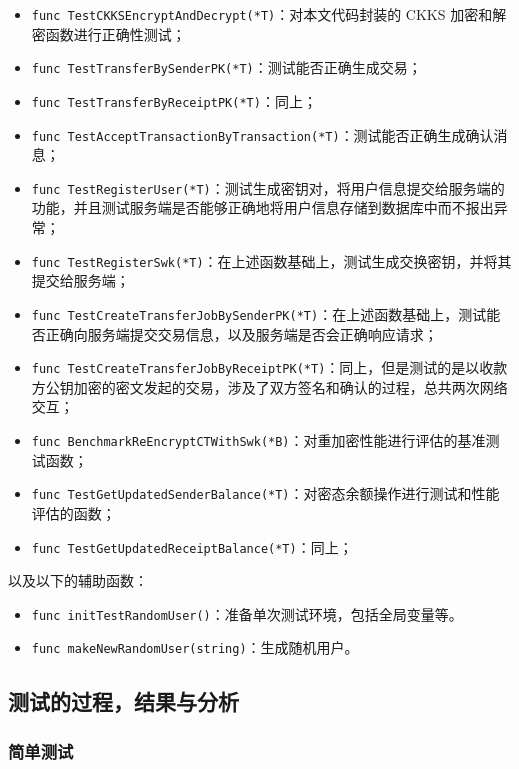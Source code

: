 \begin{itemize}
    \item \verb|func TestCKKSEncryptAndDecrypt(*T)|：对本文代码封装的 CKKS 加密和解密函数进行正确性测试；
    \item \verb|func TestTransferBySenderPK(*T)|：测试能否正确生成交易；
    \item \verb|func TestTransferByReceiptPK(*T)|：同上；
    \item \verb|func TestAcceptTransactionByTransaction(*T)|：测试能否正确生成确认消息；
    \item \verb|func TestRegisterUser(*T)|：测试生成密钥对，将用户信息提交给服务端的功能，并且测试服务端是否能够正确地将用户信息存储到数据库中而不报出异常；
    \item \verb|func TestRegisterSwk(*T)|：在上述函数基础上，测试生成交换密钥，并将其提交给服务端；
    \item \verb|func TestCreateTransferJobBySenderPK(*T)|：在上述函数基础上，测试能否正确向服务端提交交易信息，以及服务端是否会正确响应请求；
    \item \verb|func TestCreateTransferJobByReceiptPK(*T)|：同上，但是测试的是以收款方公钥加密的密文发起的交易，涉及了双方签名和确认的过程，总共两次网络交互；
    \item \verb|func BenchmarkReEncryptCTWithSwk(*B)|：对重加密性能进行评估的基准测试函数；
    \item \verb|func TestGetUpdatedSenderBalance(*T)|：对密态余额操作进行测试和性能评估的函数；
    \item \verb|func TestGetUpdatedReceiptBalance(*T)|：同上；
\end{itemize}

以及以下的辅助函数：

\begin{itemize}
    \item \verb|func initTestRandomUser()|：准备单次测试环境，包括全局变量等。
    \item \verb|func makeNewRandomUser(string)|：生成随机用户。
\end{itemize}

\subsection{测试的过程，结果与分析}

\subsubsection{简单测试}

